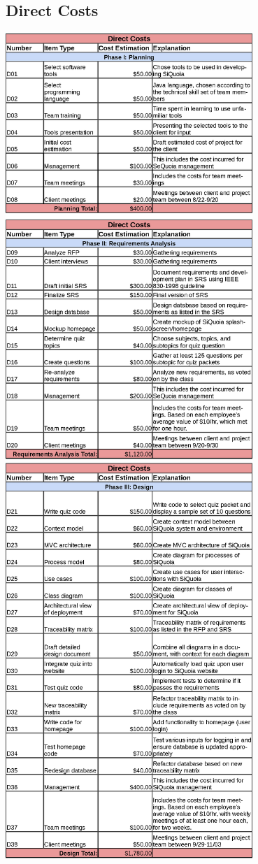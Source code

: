\documentclass[12pt]{article}
\begin{document}
\subsection{Direct Costs}
\begin{center}
\includegraphics[width=0.7\textwidth]{chart0}
\newpage
\includegraphics[width=0.7\textwidth]{chart1}

\end{center}
\end{document}

